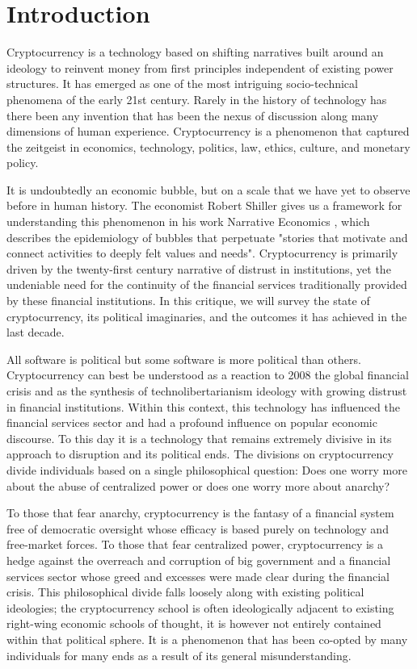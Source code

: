 \chapter{Introduction}

Cryptocurrency is a technology based on shifting narratives built around
an ideology to reinvent money from first principles independent of
existing power structures. It has emerged as one of the most intriguing
socio-technical phenomena of the early 21st century. Rarely in the
history of technology has there been any invention that has been the
nexus of discussion along many dimensions of human experience.
Cryptocurrency is a phenomenon that captured the zeitgeist in economics,
technology, politics, law, ethics, culture, and monetary policy.

It is undoubtedly an economic bubble, but on a scale that we have yet to
observe before in human history. The economist Robert Shiller gives us a
framework for understanding this phenomenon in his work Narrative
Economics \cite{shiller_narrative_2017}, which describes the epidemiology of
bubbles that perpetuate "stories that motivate and connect
activities to deeply felt values and needs". Cryptocurrency is
primarily driven by the twenty-first century narrative of distrust in
institutions, yet the undeniable need for the continuity of the
financial services traditionally provided by these financial
institutions. In this critique, we will survey the state of
cryptocurrency, its political imaginaries, and the outcomes it has
achieved in the last decade.

All software is political but some software is more political than
others. Cryptocurrency can best be understood as a reaction to 2008
the global financial crisis and as the synthesis of technolibertarianism
ideology with growing distrust in financial institutions. Within this
context, this technology has influenced the financial services sector and
had a profound influence on popular economic discourse. To this day it
is a technology that remains extremely divisive in its approach to
disruption and its political ends. The divisions on cryptocurrency
divide individuals based on a single philosophical question: Does one
worry more about the abuse of centralized power or does one worry more
about anarchy?

To those that fear anarchy, cryptocurrency is the fantasy of a financial
system free of democratic oversight whose efficacy is based purely on
technology and free-market forces. To those that fear centralized power,
cryptocurrency is a hedge against the overreach and corruption of big
government and a financial services sector whose greed and excesses were
made clear during the financial crisis. This philosophical divide falls
loosely along with existing political ideologies; the cryptocurrency school
is often ideologically adjacent to existing right-wing economic schools
of thought, it is however not entirely contained within that political
sphere. It is a phenomenon that has been co-opted by many individuals
for many ends as a result of its general misunderstanding.

